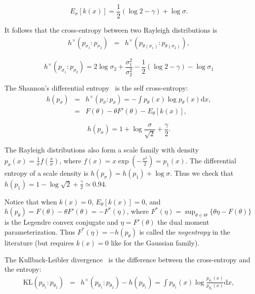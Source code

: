 \documentclass{article}
\def\dx{\mathrm{d}x}
\def\KL{\mathrm{KL}}
\begin{document}
\begin{equation}
\boxed{E_\sigma[k(x)]=  \frac{1}{2}(\log 2-\gamma) +\log \sigma.}
\end{equation}

It follows that the cross-entropy between two Rayleigh distributions is
\begin{eqnarray*}
h^\times(p_{\sigma_1}:p_{\sigma_2}) &=& h^\times(p_{\theta(\sigma_1)}:p_{\theta(\sigma_2)}),
\end{eqnarray*}

\begin{equation}
\boxed{h^\times(p_{\sigma_1}:p_{\sigma_2}) = 2\log \sigma_2 + \frac{\sigma_1^2}{\sigma_2^2}  - \frac{1}{2}(\log 2-\gamma) -\log \sigma_1}
\end{equation}

The Shannon's differential entropy~\cite{CT-2012} is the self cross-entropy:
\begin{eqnarray*}
h(p_{\sigma}) &=& h^\times(p_{\sigma}:p_{\sigma})=-\int p_{\theta}(x)\log p_{\theta}(x) \dx ,\\
&=& F(\theta)-\theta F'(\theta)-E_{{\theta}}[k(x)],
\end{eqnarray*}

\begin{equation}
\boxed{ h(p_{\sigma}) = 1+ \log \frac{\sigma}{\sqrt{2}}  + \frac{\gamma}{2}.}
\end{equation}


The Rayleigh distributions also form a scale family with density $p_{\sigma}(x)=\frac{1}{\sigma}f\left(\frac{x}{\sigma}\right)$, where
$f(x)=x\exp(-\frac{x^2}{2})=p_1(x)$. The differential entropy of a scale density is $h(p_{\sigma})=h(p_{1})+\log \sigma$.
Thus we check that $h(p_{1})=1 - \log{\sqrt{2}} +\frac{\gamma}{2} \simeq 0.94$.



Notice that when $k(x)=0$, $E_{{\theta}}[k(x)]=0$, and $h(p_{\theta})=F(\theta)-\theta F'(\theta)=-F^*(\eta)$,
 where $F^*(\eta)=\sup_{\theta\in\Theta} \{\theta\eta-F(\theta)\}$ is the Legendre convex conjugate and $\eta=F'(\theta)$ the dual moment parameterization.
Thus $F^*(\eta)=-h(p_{\theta})$ is called the {\em negentropy} in the literature (but requires $k(x)=0$ like for the Gaussian family).


The Kullback-Leibler divergence~\cite{CT-2012} is the difference between the cross-entropy and the entropy:
\begin{eqnarray*}
\KL(p_{\theta_1}:p_{\theta_2}) &=&  h^\times(p_{\theta_1}:p_{\theta_2}) - h(p_{\theta_1}) = \int p_{\theta_1}(x)\log \frac{p_{\theta_1}(x)}{p_{\theta_2}(x)} \dx,
\end{eqnarray*}
\end{document}

